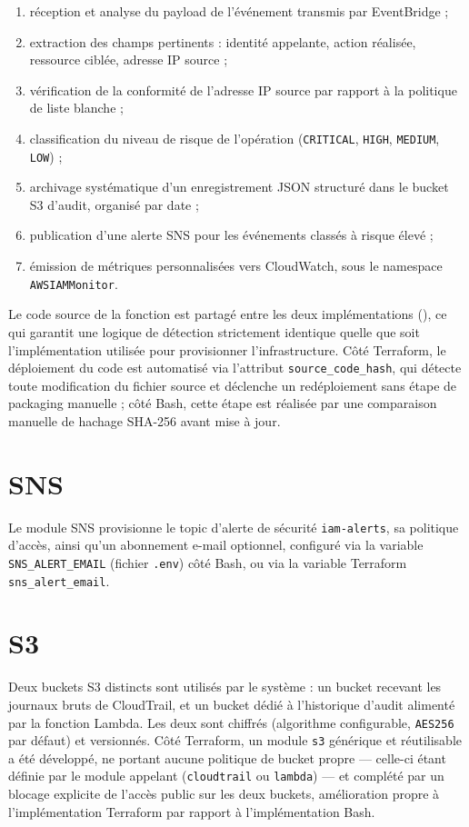 \documentclass[11pt,a4paper]{report}
\begin{document}
\begin{enumerate}[leftmargin=1.6em]
  \item réception et analyse du payload de l'événement transmis par EventBridge ;
  \item extraction des champs pertinents : identité appelante, action réalisée, ressource ciblée, adresse IP source ;
  \item vérification de la conformité de l'adresse IP source par rapport à la politique de liste blanche ;
  \item classification du niveau de risque de l'opération (\texttt{CRITICAL}, \texttt{HIGH}, \texttt{MEDIUM}, \texttt{LOW}) ;
  \item archivage systématique d'un enregistrement JSON structuré dans le bucket S3 d'audit, organisé par date ;
  \item publication d'une alerte SNS pour les événements classés à risque élevé ;
  \item émission de métriques personnalisées vers CloudWatch, sous le namespace \texttt{AWSIAMMonitor}.
\end{enumerate}

Le code source de la fonction est partagé entre les deux implémentations (), ce qui garantit une logique de détection strictement identique quelle que soit l'implémentation utilisée pour provisionner l'infrastructure. Côté Terraform, le déploiement du code est automatisé via l'attribut \texttt{source\_code\_hash}, qui détecte toute modification du fichier source et déclenche un redéploiement sans étape de packaging manuelle ; côté Bash, cette étape est réalisée par une comparaison manuelle de hachage SHA-256 avant mise à jour.

\section{SNS}

Le module SNS provisionne le topic d'alerte de sécurité \texttt{iam-alerts}, sa politique d'accès, ainsi qu'un abonnement e-mail optionnel, configuré via la variable \texttt{SNS\_ALERT\_EMAIL} (fichier \texttt{.env}) côté Bash, ou via la variable Terraform \texttt{sns\_alert\_email}.

\section{S3}

Deux buckets S3 distincts sont utilisés par le système : un bucket recevant les journaux bruts de CloudTrail, et un bucket dédié à l'historique d'audit alimenté par la fonction Lambda. Les deux sont chiffrés (algorithme configurable, \texttt{AES256} par défaut) et versionnés. Côté Terraform, un module \texttt{s3} générique et réutilisable a été développé, ne portant aucune politique de bucket propre — celle-ci étant définie par le module appelant (\texttt{cloudtrail} ou \texttt{lambda}) — et complété par un blocage explicite de l'accès public sur les deux buckets, amélioration propre à l'implémentation Terraform par rapport à l'implémentation Bash.
\end{document}
